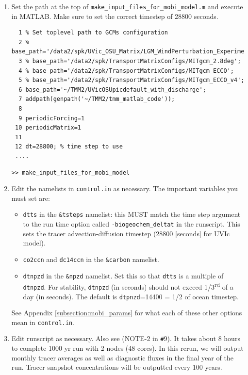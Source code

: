 \documentclass[a4paper]{article}
\def\noin{\noindent }
\begin{document}
\begin{enumerate}
\item Set the path at the top of \verb|make_input_files_for_mobi_model.m| and execute in MATLAB. Make sure to set the correct timestep of 28800 seconds. 
\lstset{language=matlab} 
\begin{lstlisting}[frame=single,basicstyle=\scriptsize,commentstyle=\color{blue}]
 % make_input_files_for_mobi_model.m
  1 % Set toplevel path to GCMs configuration
  2 % base_path='/data2/spk/UVic_OSU_Matrix/LGM_WindPerturbation_Experiments/no_embm_awind2/picdefault';
  3 % base_path='/data2/spk/TransportMatrixConfigs/MITgcm_2.8deg';
  4 % base_path='/data2/spk/TransportMatrixConfigs/MITgcm_ECCO';
  5 % base_path='/data2/spk/TransportMatrixConfigs/MITgcm_ECCO_v4';
  6 base_path='~/TMM2/UVicOSUpicdefault_with_discharge';
  7 addpath(genpath('~/TMM2/tmm_matlab_code'));
  8
  9 periodicForcing=1
 10 periodicMatrix=1
 11
 12 dt=28800; % time step to use
 ....
\end{lstlisting}
\begin{lstlisting}[style=DOS]
 >> make_input_files_for_mobi_model
\end{lstlisting}

\item Edit the namelists in \verb|control.in| as necessary. The important variables you 
must set are:

\begin{itemize}
\item \verb|dtts| in the \verb|&tsteps| namelist: this MUST match the time step argument to the run time option called \verb|-biogeochem_deltat| in the runscript. This sets the tracer advection-diffusion timestep (28800 [seconds] for UVIc model). 
\item \verb|co2ccn| and \verb|dc14ccn| in the \verb|&carbon| namelist. 
\item \verb|dtnpzd| in the \verb|&npzd| namelist. Set this so that \verb|dtts| is a multiple of \verb|dtnpzd|. For stability, \verb|dtnpzd| (in seconds) should not exceed 1/3\textsuperscript{rd} of a day (in seconds). The default is \verb|dtpnzd|=14400 = 1/2 of ocean timestep. 
\end{itemize}
\noin See Appendix \ref{subsection:mobi_params} for what each of these other options mean in \verb|control.in|. 

\item Edit runscript as necessary. Also see (NOTE-2 in \verb|#|9). It takes about 8 hours to complete 1000 yr run with 2 nodes (48 cores). In this rerun, we will output monthly tracer averages as well as diagnostic fluxes in the final year of the run. Tracer snapshot concentrations will be outputted every 100 years.


\end{enumerate}
\end{document}
